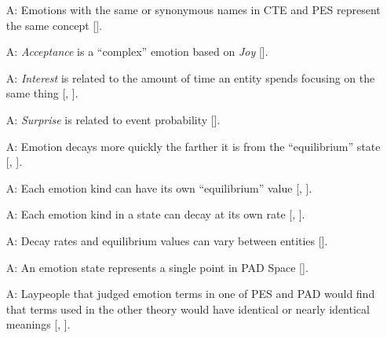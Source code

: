 \begin{itemize}
    \item[A\refstepcounter{assumpnum}\theassumpnum \label{A_CTE2PES}:]
    Emotions with the same or synonymous names in CTE and PES represent the
    same concept [].

    \item[A\refstepcounter{assumpnum}\theassumpnum \label{A_Acceptance}:]
    \textit{Acceptance} is a ``complex'' emotion based on \textit{Joy}
    [].

    \item[A\refstepcounter{assumpnum}\theassumpnum \label{A_Interest}:]
    \textit{Interest} is related to the amount of time an entity spends
    focusing on the same thing [,
    ].

    \item[A\refstepcounter{assumpnum}\theassumpnum \label{A_Surprise}:]
    \textit{Surprise} is related to event probability
    [].

     \item[A\refstepcounter{assumpnum}\theassumpnum \label{A_DecaySpeed}:]
     Emotion decays more quickly the farther it is from the ``equilibrium''
     state [, ].

     \item[A\refstepcounter{assumpnum}\theassumpnum \label{A_Equilibrium}:]
     Each emotion kind can have its own ``equilibrium'' value
     [, ].

     \item[A\refstepcounter{assumpnum}\theassumpnum \label{A_DecayRate}:]
     Each emotion kind in a state can decay at its own rate
     [, ].

    \item[A\refstepcounter{assumpnum}\theassumpnum \label{A_DecayUnique}:]
    Decay rates and equilibrium values can vary between entities
    [].

    \item[A\refstepcounter{assumpnum}\theassumpnum \label{A_OnePADPoint}:]
    An emotion state represents a single point in PAD Space
    [].

    \item[A\refstepcounter{assumpnum}\theassumpnum \label{A_EmotionTerms}:]
    Laypeople that judged emotion terms in one of PES and PAD would find that
    terms used in the other theory would have identical or nearly identical
    meanings [, ].


\end{itemize}
